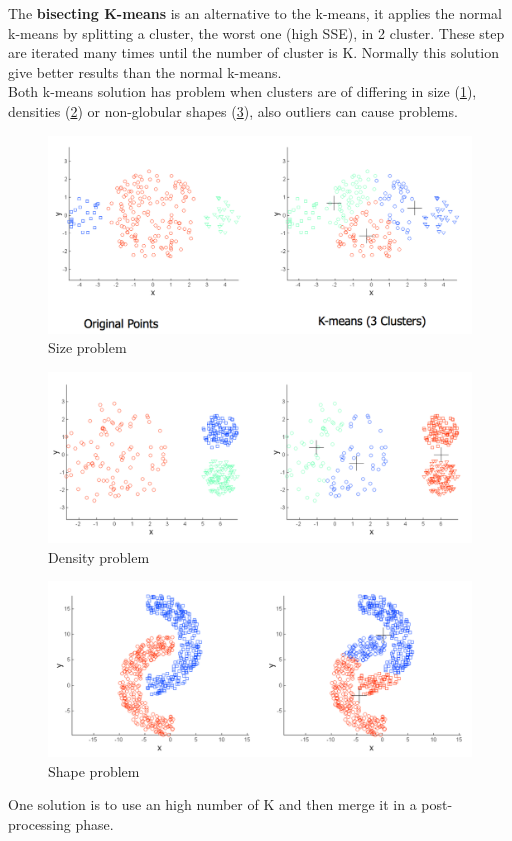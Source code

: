 \documentclass[12pt]{article}
\begin{document}
The \textbf{bisecting K-means} is an alternative to the k-means, it applies the normal k-means by splitting a cluster,  the worst one (high SSE), in 2 cluster. These step are iterated many times until the number of cluster is K. Normally this solution give better results than the normal k-means.\\
Both k-means solution has problem when clusters are of differing in size (\ref{fig:size}), densities (\ref{fig:dens}) or non-globular shapes (\ref{fig:shape}), also outliers can cause problems.
\begin{figure}[h!]
  \includegraphics[width=\linewidth]{images/size.png}
  \caption{Size problem}
  \label{fig:size}
\end{figure}
\begin{figure}[h!]
  \includegraphics[width=\linewidth]{images/dens.png}
  \caption{Density problem}
  \label{fig:dens}
\end{figure}
\begin{figure}[h!]
  \includegraphics[width=\linewidth]{images/shape.png}
  \caption{Shape problem}
  \label{fig:shape}
\end{figure}
One solution is to use an high number of K and then merge it in a post-processing phase.
\end{document}
